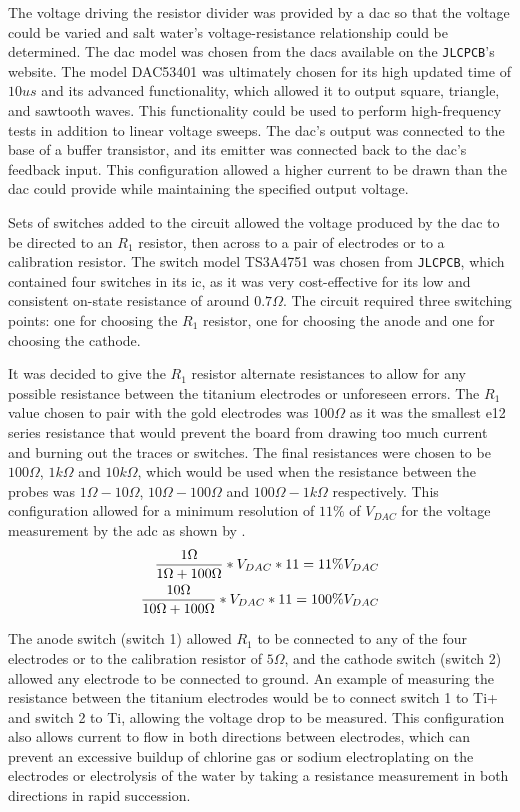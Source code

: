 The voltage driving the resistor divider was provided by a \gls{dac} so that the voltage could be varied and salt water's voltage-resistance relationship could be determined.
The \gls{dac} model was chosen from the \glspl{dac} available on the \texttt{JLCPCB}'s website.
The model DAC53401 was ultimately chosen for its high updated time of $10us$ and its advanced functionality, which allowed it to output square, triangle, and sawtooth waves.
This functionality could be used to perform high-frequency tests in addition to linear voltage sweeps.
The \gls{dac}'s output was connected to the base of a buffer transistor, and its emitter was connected back to the \gls{dac}'s feedback input.
This configuration allowed a higher current to be drawn than the \gls{dac} could provide while maintaining the specified output voltage.

Sets of switches added to the circuit allowed the voltage produced by the \gls{dac} to be directed to an $R_1$ resistor, then across to a pair of electrodes or to a calibration resistor.
The switch model TS3A4751 was chosen from \texttt{JLCPCB}, which contained four switches in its \gls{ic}, as it was very cost-effective for its low and consistent on-state resistance of around $0.7\Omega$.
The circuit required three switching points: one for choosing the $R_1$ resistor, one for choosing the anode and one for choosing the cathode.

It was decided to give the $R_1$ resistor alternate resistances to allow for any possible resistance between the titanium electrodes or unforeseen errors.
The $R_1$ value chosen to pair with the gold electrodes was $100\Omega$ as it was the smallest e12 series resistance that would prevent the board from drawing too much current and burning out the traces or switches.
The final resistances were chosen to be $100\Omega$,  $1k\Omega$ and $10k\Omega$, which would be used when the resistance between the probes was $1\Omega - 10\Omega$, $10\Omega - 100\Omega$ and $100\Omega - 1k\Omega$ respectively.
This configuration allowed for a minimum resolution of $11\%$ of $V_{DAC}$ for the voltage measurement by the \gls{adc} as shown by .
\begin{align}\label{eqn:adc-resolution}
 \frac{\displaystyle 1\Omega}{\displaystyle 1\Omega + 100\Omega} * V_{DAC} * 11 = 11\%V_{DAC} \\
 \frac{\displaystyle 10\Omega}{\displaystyle 10\Omega + 100\Omega} * V_{DAC} * 11 = 100\%V_{DAC}
\end{align} 

The anode switch (switch 1) allowed $R_1$ to be connected to any of the four electrodes or to the calibration resistor of $5\Omega$, and the cathode switch (switch 2) allowed any electrode to be connected to ground.
An example of measuring the resistance between the titanium electrodes would be to connect switch 1 to Ti+ and switch 2 to Ti, allowing the voltage drop to be measured.
This configuration also allows current to flow in both directions between electrodes, which can prevent an excessive buildup of chlorine gas or sodium electroplating on the electrodes or electrolysis of the water by taking a resistance measurement in both directions in rapid succession.

